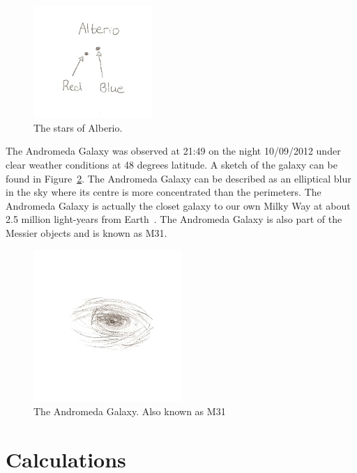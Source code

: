 \documentclass{article}
\begin{document}
\begin{figure}[h!]
\centering
\includegraphics[width=0.4\textwidth]{images/alberio}
\caption{The stars of Alberio.\label{fig:alberio}}
\end{figure}

The Andromeda Galaxy was observed at 21:49 on the night 10/09/2012 under clear weather conditions at 48 degrees latitude. A
sketch of the galaxy can be found in Figure~\ref{fig:andg}. The Andromeda Galaxy can be described as an elliptical blur in the sky
where its centre is more concentrated than the perimeters. The Andromeda Galaxy is actually the closet galaxy to our own 
Milky Way at about 2.5 million light-years from Earth~\cite{Ribas:2005}. The Andromeda Galaxy is also part of the Messier objects and is known as M31.

\begin{figure}[h!]
\centering
\includegraphics[width=0.5\textwidth]{images/andromedagalaxy}
\caption{The Andromeda Galaxy. Also known as M31\label{fig:andg}}
\end{figure}



\section{Calculations}
\end{document}

